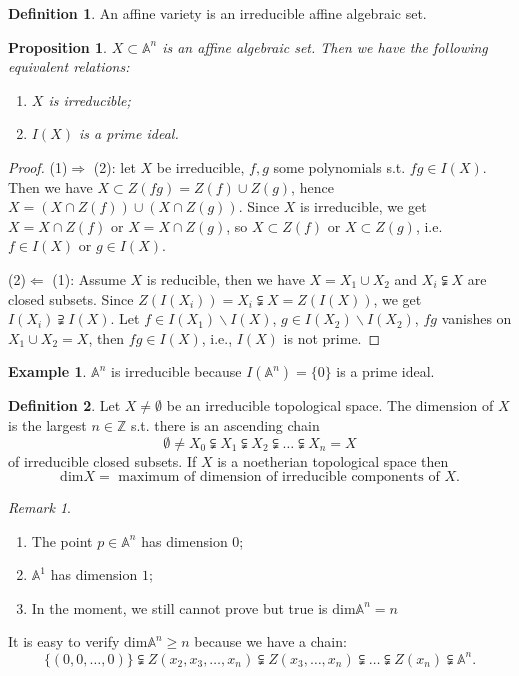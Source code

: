 \documentclass{amsart}
\theoremstyle{plain}
\newtheorem{proposition}{Proposition}
\theoremstyle{definition}
\newtheorem{definition}{Definition}
\newtheorem{example}{Example}
\theoremstyle{remark}
\newtheorem*{remark}{Remark}
\numberwithin{equation}{section}
\begin{document}
 \begin{definition}
 	An affine variety is an irreducible affine algebraic set.
 \end{definition}
 \begin{proposition}\label{5}
 	$ X\subset \mathbb{A}^n $ is an affine algebraic set. Then we have the following equivalent relations:
 	\begin{enumerate}
 		\item $ X $ is irreducible;
 		\item $ I(X) $ is a prime ideal.
 	\end{enumerate}
 \end{proposition}
 \begin{proof}
 	(1)$ \Rightarrow $ (2): let $ X $ be irreducible, $ f,g $ some polynomials s.t. $ fg\in I(X) $. Then we have $ X\subset Z(fg)=Z(f)\cup Z(g) $, hence $ X=(X\cap Z(f))\cup (X\cap Z(g)) $. Since $ X $ is irreducible, we get $ X=X\cap Z(f) $ or $ X=X\cap Z(g) $, so $ X\subset Z(f) $ or $ X\subset Z(g) $, i.e. $ f\in I(X) $ or $ g\in I(X) $.
 	
 	(2)$ \Leftarrow $ (1): Assume $ X $ is reducible, then we have $ X=X_1\cup X_2 $ and $ X_i\subsetneqq X $ are closed subsets.
 	Since $ Z(I(X_i))=X_i\subsetneqq X=Z(I(X)) $, we get $ I(X_i)\supsetneqq I(X) $. Let $ f\in I(X_1)\backslash I(X) $, $ g\in I(X_2)\backslash I(X_2) $, $ fg $ vanishes on $ X_1\cup X_2=X $, then $ fg\in I(X) $, i.e., $ I(X) $ is not prime.
 \end{proof}
 \begin{example}
 	$ \mathbb{A}^n $ is irreducible because $ I(\mathbb{A}^n) = \{ 0\} $ is a prime ideal.
 \end{example}
 \begin{definition}
 	Let $ X\neq \emptyset $ be an irreducible topological space. The dimension of $ X $ is the largest $ n\in\mathbb{Z} $ s.t. there is an ascending chain
 	$$
 	\emptyset \neq X_0\subsetneqq X_1\subsetneqq X_2\subsetneqq \dots\subsetneqq X_n=X
 	$$
 	of irreducible closed subsets. If $ X $ is a noetherian topological space then
 	$$
 	\text{dim}X=\text{ maximum of dimension of irreducible components of } X.
 	$$
 \end{definition}
 \begin{remark}
 	\begin{enumerate}
 		\item The point $ p\in\mathbb{A}^n $ has dimension $ 0 $;
 		\item $ \mathbb{A}^1 $ has dimension $ 1 $;
 		\item In the moment, we still cannot prove but true is $ \text{dim}\mathbb{A}^n=n $
 	\end{enumerate}
 	It is easy to verify $ \text{dim}\mathbb{A}^n\geq n $ because we have a chain:
 	$$
 	\{(0,0,\dots,0)\}\subsetneqq Z(x_2,x_3,\dots,x_n)\subsetneqq Z(x_3,\dots,x_n)\subsetneqq\dots\subsetneqq Z(x_n)\subsetneqq \mathbb{A}^n.
 	$$
 \end{remark}
\end{document}
